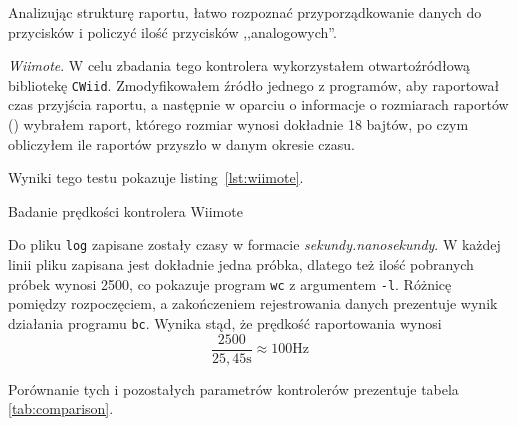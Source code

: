 Analizując strukturę raportu, łatwo rozpoznać przyporządkowanie danych do przycisków i policzyć ilość przycisków ,,analogowych''.
\newline

\textsl{Wiimote}. W celu zbadania tego kontrolera wykorzystałem otwartoźródłową bibliotekę \texttt{CWiid}\citep{CWiid}. Zmodyfikowałem źródło jednego z programów, aby raportował czas przyjścia raportu, a następnie w oparciu o informacje o rozmiarach raportów (\citep{Wiibrew}) wybrałem raport, którego rozmiar wynosi dokładnie 18 bajtów, po czym obliczyłem ile raportów przyszło w danym okresie czasu.

Wyniki tego testu pokazuje listing~\ref{lst:wiimote}.

\begin{listing}
  
  \caption{Badanie prędkości kontrolera Wiimote}
  \label{lst:wiimote}
\end{listing}

Do pliku \texttt{log} zapisane zostały czasy w formacie \textit{sekundy.nanosekundy}. W każdej linii pliku zapisana jest dokładnie jedna próbka, dlatego też ilość pobranych próbek wynosi 2500, co pokazuje program \texttt{wc} z argumentem \texttt{-l}. Różnicę pomiędzy rozpoczęciem, a zakończeniem rejestrowania danych prezentuje wynik działania programu \texttt{bc}. Wynika stąd, że prędkość raportowania wynosi
\begin{equation}
 \frac{2500}{25,45\textrm{s}} \approx 100\textrm{Hz}
\end{equation}

Porównanie tych i pozostałych parametrów kontrolerów prezentuje tabela \ref{tab:comparison}.


